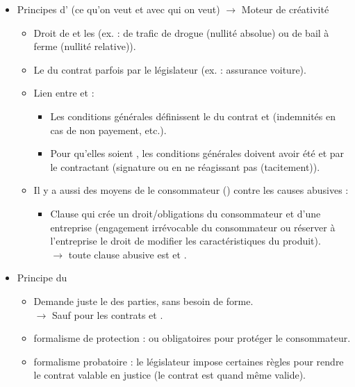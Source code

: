 \begin{itemize}
	\item Principes d' (ce qu'on veut et avec qui on veut) $\rightarrow$ Moteur de créativité
	\begin{itemize}
		\item Droit de  et les  (ex. : de trafic de drogue (nullité absolue) ou de bail à ferme (nullité relative)).
		\item Le  du contrat parfois  par le législateur (ex. : assurance voiture).
		\item Lien entre  et  :
		\begin{itemize}
			\item Les conditions générales définissent le  du contrat et  (indemnités en cas de non payement, etc.).
			\item Pour qu'elles soient , les conditions générales doivent avoir été  et  par le contractant (signature ou en ne réagissant pas (tacitement)).
		\end{itemize}
		\item Il y a aussi des moyens de  le consommateur () contre les causes abusives :
		\begin{itemize}
			\item Clause qui crée un  droit/obligations du consommateur et d'une entreprise (engagement irrévocable du consommateur ou réserver à l'entreprise le droit de modifier les caractéristiques du produit).\\
			$\rightarrow$ toute clause abusive est  et .
		\end{itemize}
	\end{itemize}
	\item Principe du 
	\begin{itemize}
		\item Demande juste le  des parties, sans besoin de forme.\\
		$\rightarrow$ Sauf pour les contrats  et .
		\item formalisme de protection :  ou  obligatoires pour protéger le consommateur.
		\item formalisme probatoire : le législateur impose certaines règles pour rendre le contrat valable en justice (le contrat est quand même valide).

\end{itemize}
\end{itemize}
